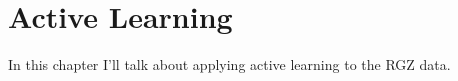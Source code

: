 \chapter{Active Learning}

In this chapter I'll talk about applying active learning to the RGZ data.
